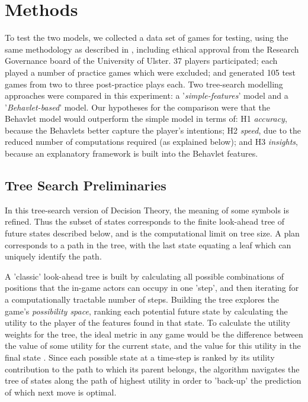 \documentclass[conference]{IEEEtran}
\begin{document}
\section{Methods}
\label{methods}
To test the two models, we collected a data set of games for testing, using the same methodology as described in \cite{Cowley2016behavlet}, including ethical approval from the Research Governance board of the University of Ulster. 37 players participated; each played a number of practice games which were excluded; and generated 105 test games from two to three post-practice plays each. Two tree-search modelling approaches were compared in this experiment: a '\textit{simple-features}' model and a '\textit{Behavlet-based}' model. Our hypotheses for the comparison were that the Behavlet model would outperform the simple model in terms of: \textsf{H1} \textit{accuracy}, because the Behavlets better capture the player's intentions; \textsf{H2} \textit{speed}, due to the reduced number of computations required (as explained below); and \textsf{H3} \textit{insights}, because an explanatory framework is built into the Behavlet features.

\subsection{Tree Search Preliminaries}
In this tree-search version of Decision Theory, the meaning of some symbols is refined. Thus the subset of states  corresponds to the finite look-ahead tree of future states described below, and  is the computational limit on tree size. A plan  corresponds to a path in the tree, with the last state  equating a leaf which can uniquely identify the path.

A 'classic' look-ahead tree is built by calculating all possible combinations of positions that the in-game actors can occupy in one 'step', and then iterating for a computationally tractable number of steps. Building the tree explores the game's \textit{possibility space}, ranking each potential future state by calculating the utility to the player of the features found in that state. To calculate the utility weights for the tree, the ideal metric in any game would be the difference between the value of some utility for the current state, and the value for this utility in the final state \cite{Samuel1959}. Since each possible state at a time-step is ranked by its utility contribution to the path to which its parent belongs, the algorithm navigates the tree of states along the path of highest utility in order to 'back-up' the prediction of which next move is optimal.
\end{document}
